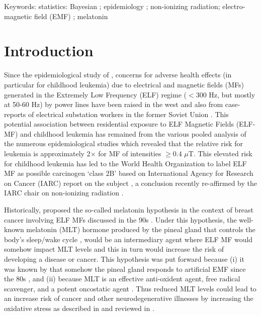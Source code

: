 \documentclass[letter,twoside]{article}
\begin{document}
Keywords:
statistics: Bayesian ; epidemiology ; non-ionizing radiation; electro-magnetic field (EMF) ; melatonin


\clearpage

\section*{Introduction}

Since the epidemiological study of  \citet{Wertheimer1979},
concerns for  adverse health effects (in particular for childhood leukemia) due to electrical and magnetic fields (MFs) 
generated   in the Extremely Low Frequency (ELF) regime ($< 300$ Hz, but mostly at 50-60 Hz)   by power lines have been
raised in the west and   also from  case-reports of electrical substation workers in the former Soviet Union   \citep[e.g.][]{Zhadin2001}.
This potential association between residential exposure to ELF Magnetic Fields (ELF-MF) and childhood leukemia has remained from the various pooled analysis of the numerous epidemiological studies \citep{Ahlbom2000,Savitz2003,Draper2005,Kheifets2005,Schuz2007,Kheifets2013,SermageFaure2013,Schuz2016} which revealed that the relative risk for leukemia  is approximately 2$\times$ for MF of intensities $\geq0.4$ $\mu$T. 	
This elevated risk for childhood leukemia has led to the World Health Organization to label ELF MF as possible carcinogen `class 2B' based on  International Agency for Research on Cancer (IARC) report on the subject \citep{iarc2002},
a conclusion recently re-affirmed by the  IARC chair on non-ionizing radiation \citep{Schuz2016}.

Historically, \citet{Stevens1996} proposed the so-called melatonin   hypothesis
in the context of breast cancer involving ELF MFs
discussed in the 90s \citep[as reviewed in ][]{Brainard1999,Kliukiene2004}.
Under this hypothesis, the well-known  melatonin (MLT)  hormone produced by the pineal gland
that  controls  the body’s sleep/wake cycle \citep[e.g.][]{Reiter1985,Reiter1991}, 
 would be an intermediary agent where  ELF MF would somehow impact MLT levels and this  in turn
would increase the risk of developing a disease or cancer.  This hypothesis was put forward 
because (i) it was known by \citet{} that somehow the pineal gland responds to artificial EMF since  the 80s
\citep{Stemm1980,Wilson1989,Wilson1990,Reiter1992,Reiter1993,Reiter1994,Stevens1996},
 and (ii) because MLT is an effective anti-oxident agent, free radical scavenger, and a potent oncostatic agent \citep[e.g.][]{Panzer1997,Allegra2003,Rodriguez2004,Henshaw2005,Jung2006,Reiter2016}.  
 Thus reduced MLT  levels could lead to an increase risk of cancer \citep{Guenel1996,Kliukiene2004,Koeman2014} and other neurodegenerative  illnesses \citep{Feychting2003,Huss2009, Huss2018,Davanipour2014} by increasing the oxidative stress as described in \citet{Mevissen1998} and reviewed in \citet{Consales2012}.
 
\end{document}
